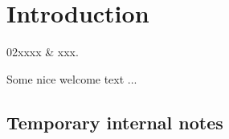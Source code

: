 %
%
\chapter{Introduction}
 \label{sec:intro}

%
%
\starthistory
  02xxxx & xxx.\\
\stophistory


Some nice welcome text ...

\section{Temporary internal notes}

